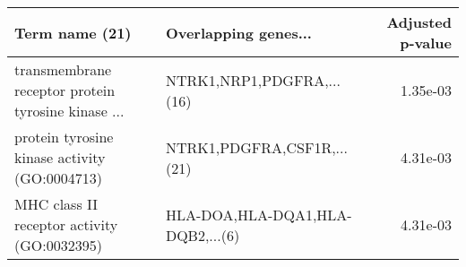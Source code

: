 \begin{tabular}{llr}
\toprule
                                    Term name (21) &             Overlapping genes... &  Adjusted p-value \\
\midrule
transmembrane receptor protein tyrosine kinase ... &        NTRK1,NRP1,PDGFRA,...(16) &          1.35e-03 \\
     protein tyrosine kinase activity (GO:0004713) &       NTRK1,PDGFRA,CSF1R,...(21) &          4.31e-03 \\
       MHC class II receptor activity (GO:0032395) & HLA-DOA,HLA-DQA1,HLA-DQB2,...(6) &          4.31e-03 \\
\bottomrule
\end{tabular}
